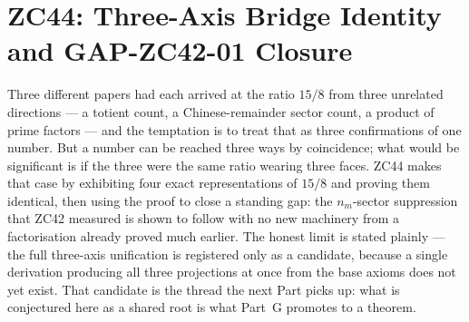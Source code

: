 \documentclass[12pt, a4paper]{article}
\begin{document}




\newpage

\section{ZC44: Three-Axis Bridge Identity and GAP-ZC42-01 Closure}
\label{sec:zc44}

Three different papers had each arrived at the ratio $15/8$ from three unrelated
directions --- a totient count, a Chinese-remainder sector count, a product of
prime factors --- and the temptation is to treat that as three confirmations of
one number. But a number can be reached three ways by coincidence; what would be
significant is if the three were the same ratio wearing three faces. ZC44 makes
that case by exhibiting four exact representations of $15/8$ and proving them
identical, then using the proof to close a standing gap: the $n_m$-sector
suppression that ZC42 measured is shown to follow with no new machinery from a
factorisation already proved much earlier. The honest limit is stated plainly ---
the full three-axis unification is registered only as a candidate, because a
single derivation producing all three projections at once from the base axioms
does not yet exist. That candidate is the thread the next Part picks up: what is
conjectured here as a shared root is what Part~G promotes to a theorem.

\begin{abstract}
Three recent Z-Programme papers --- ZC18-B (totient axis),
ZC42 (CRT axis), and ZC43 (divisor axis) --- each project
$\mathbb{Z}_{15}$ onto a different mathematical plane.
This paper shows they share a single anchor:
the mode-redundancy ratio
$\mathcal{R} = d_s \cdot n_m / n = 15/8$,
which is simultaneously the mode-redundancy ratio of ZC18-B,
the CRT-sector count of ZC42, and the prime-factor product
of ZC43.

The central algebraic result (FIND-ZC44-01) is that $\mathcal{R}$
admits four exact representations which are provably identical.
A numerical probe (9 independent checks, all passing) confirms
consistency across all three papers to better than $0.05\%$.

As the main theorem (THM-ZC44-01), we close GAP-ZC42-01
--- the open gap requiring a formal derivation of $n_m$-sector
suppression from $\delta$-chain axioms.
The closure requires no new machinery:
THM-Z201 already establishes $\Zft \cong \Zth \times \Zfi$
via CRT, which immediately yields $n_m = |\Zfi| = 5$
independent sectors.
ZC18-B's ID-B01 uses the same CRT factorisation.
The two derivations are branches of the same root.

The three-axis picture is registered as CONJ-ZC44-01
(Candidate), awaiting a single unified derivation
from Axioms~0--3 that produces all three projections
simultaneously.
\end{abstract}
\end{document}

